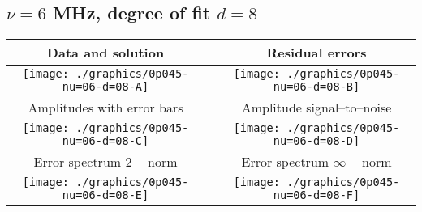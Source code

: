 

% 

\clearpage{}
\break{}

\subsection{$\nu = 6$ MHz, degree of fit $d = 8$}

\begin{table}[h]
    \begin{center}
        \begin{tabular}{ccc}
            Data and solution & \quad & Residual errors \\\hline
            \texttt{[image: ./graphics/0p045-nu=06-d=08-A]} &&
            \texttt{[image: ./graphics/0p045-nu=06-d=08-B]} \\[15pt]
            Amplitudes with error bars && Amplitude signal--to--noise \\\hline
            \texttt{[image: ./graphics/0p045-nu=06-d=08-C]} &&
            \texttt{[image: ./graphics/0p045-nu=06-d=08-D]} \\[15pt]
            Error spectrum $2-$norm && Error spectrum $\infty-$norm \\\hline
            \texttt{[image: ./graphics/0p045-nu=06-d=08-E]} &&
            \texttt{[image: ./graphics/0p045-nu=06-d=08-F]} \\[15pt]
        \end{tabular}
    \end{center}
\label{fig:elev=45, nu=6}
\end{table}



\endinput
